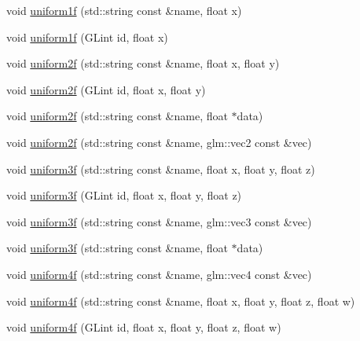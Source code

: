 \begin{DoxyCompactItemize}
void \mbox{\hyperlink{class_beer_engine_1_1_graphics_1_1_shader_program_a41c810862167978320cdb7e4c06e45d4}{uniform1f}} (std\+::string const \&name, float x)
\item 
void \mbox{\hyperlink{class_beer_engine_1_1_graphics_1_1_shader_program_a83768fb4346dd79e97d13055bcc861cb}{uniform1f}} (G\+Lint id, float x)
\item 
void \mbox{\hyperlink{class_beer_engine_1_1_graphics_1_1_shader_program_a83ec2d9185b1e539cf50e9f322ffedd1}{uniform2f}} (std\+::string const \&name, float x, float y)
\item 
void \mbox{\hyperlink{class_beer_engine_1_1_graphics_1_1_shader_program_acf8ee7ffb6ea8d29b4180bcd29f79f54}{uniform2f}} (G\+Lint id, float x, float y)
\item 
void \mbox{\hyperlink{class_beer_engine_1_1_graphics_1_1_shader_program_a92794e30b9ee5e79e3e09114d36ecf22}{uniform2f}} (std\+::string const \&name, float $\ast$data)
\item 
void \mbox{\hyperlink{class_beer_engine_1_1_graphics_1_1_shader_program_a7568ddafee4777ef5776ef8e7967994a}{uniform2f}} (std\+::string const \&name, glm\+::vec2 const \&vec)
\item 
void \mbox{\hyperlink{class_beer_engine_1_1_graphics_1_1_shader_program_a5c040e91d1e70c913e85d34697a1e33f}{uniform3f}} (std\+::string const \&name, float x, float y, float z)
\item 
void \mbox{\hyperlink{class_beer_engine_1_1_graphics_1_1_shader_program_a3044bd52410d43c5ed58b5db0f84be13}{uniform3f}} (G\+Lint id, float x, float y, float z)
\item 
void \mbox{\hyperlink{class_beer_engine_1_1_graphics_1_1_shader_program_aff28ec6e574385d817a03435aec393c2}{uniform3f}} (std\+::string const \&name, glm\+::vec3 const \&vec)
\item 
void \mbox{\hyperlink{class_beer_engine_1_1_graphics_1_1_shader_program_af0488800441bc89118f173b1512d7254}{uniform3f}} (std\+::string const \&name, float $\ast$data)
\item 
void \mbox{\hyperlink{class_beer_engine_1_1_graphics_1_1_shader_program_ac2819747448fdaff830aea62913b932b}{uniform4f}} (std\+::string const \&name, glm\+::vec4 const \&vec)
\item 
void \mbox{\hyperlink{class_beer_engine_1_1_graphics_1_1_shader_program_a38c33da991e2c955c2f6a415d747b432}{uniform4f}} (std\+::string const \&name, float x, float y, float z, float w)
\item 
void \mbox{\hyperlink{class_beer_engine_1_1_graphics_1_1_shader_program_a40984a7550bbe0fb20e696d3794007a6}{uniform4f}} (G\+Lint id, float x, float y, float z, float w)

\end{DoxyCompactItemize}
